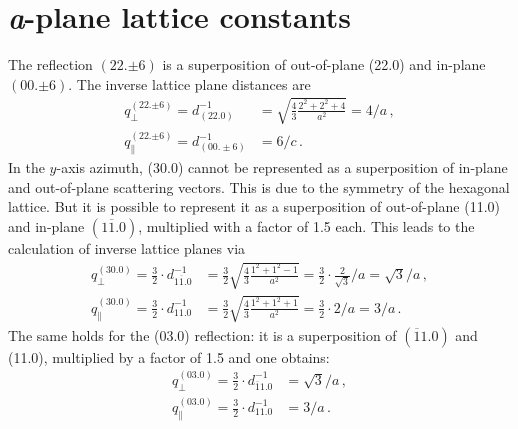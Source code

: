 \section{\textit{a}-plane lattice constants}
\label{Sec:App_Calc_aPlane}
The reflection $(22.{\pm6})$ is a superposition of out-of-plane (22.0) and in-plane $(00.{\pm6})$.
The inverse lattice plane distances are
\begin{align}
    q_\perp^{(22.{\pm6})}=
    d_{(22.0)}^{-1} &=
        \sqrt{\frac{4}{3}\frac{2^2+2^2+4}{a^2}}
        = 4/a\,,\\
    q_\parallel^{(22.{\pm6})}=
    d_{(00.\pm6)}^{-1} &= 6/c \,.
\end{align}
In the $y$-axis azimuth, (30.0) cannot be represented as a superposition of in-plane and out-of-plane scattering vectors.
This is due to the symmetry of the hexagonal lattice.
But it is possible to represent it as a superposition of out-of-plane (11.0) and in-plane $(1\overline{1}.0)$, multiplied with a factor of 1.5 each.
This leads to the calculation of inverse lattice planes via
\begin{align}
    q_\perp^{(30.0)}=
    \frac{3}{2}\cdot d_{1\overline{1}.0}^{-1} &=
        \frac{3}{2}\sqrt{\frac{4}{3}\frac{1^2+1^2-1}{a^2}}
        =\frac{3}{2}\cdot\frac{2}{\sqrt{3}}/a
        =\sqrt{3}/a\,,\\
    q_\parallel^{(30.0)}=
    \frac{3}{2}\cdot d_{11.0}^{-1} &=
        \frac{3}{2}\sqrt{\frac{4}{3}\frac{1^2+1^2+1}{a^2}}
        =\frac{3}{2}\cdot2/a
        =3/a\,.
\end{align}
The same holds for the (03.0) reflection: it is a superposition of $(\overline{1}1.0)$ and (11.0), multiplied by a factor of 1.5 and one obtains:
\begin{align}
    q_\perp^{(03.0)}=
        \frac{3}{2}\cdot d_{\overline{1}1.0}^{-1} &=
        \sqrt{3}/a\,,\\
    q_\parallel^{(03.0)}=
        \frac{3}{2}\cdot d_{11.0}^{-1} &=
        3/a\,.
\end{align}